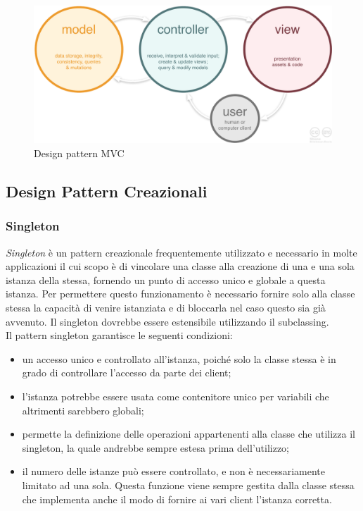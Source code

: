 \begin{figure}[H]
	\centering
	\includegraphics[width=14cm]{diagrammi_img/mvc.png}
	\caption{Design pattern MVC}
\end{figure}

\subsection{Design Pattern Creazionali}

\subsubsection{Singleton}
\textit{Singleton} è un pattern creazionale frequentemente utilizzato e necessario in molte applicazioni il cui scopo è di vincolare una classe alla creazione di una e una sola istanza della stessa, fornendo un punto di accesso unico e globale a questa istanza. Per permettere questo funzionamento è necessario fornire solo alla classe stessa la capacità di venire istanziata e di bloccarla nel caso questo sia già avvenuto. Il singleton dovrebbe essere estensibile utilizzando il subclassing.\\
Il pattern singleton garantisce le seguenti condizioni:
\begin{itemize}
	\item un accesso unico e controllato all'istanza, poiché solo la classe stessa è in grado di controllare l'accesso da parte dei client;
	\item l'istanza potrebbe essere usata come contenitore unico per variabili che altrimenti sarebbero globali;
	\item permette la definizione delle operazioni appartenenti alla classe che utilizza il singleton, la quale andrebbe sempre estesa prima dell'utilizzo;
	\item il numero delle istanze può essere controllato, e non è necessariamente limitato ad una sola. Questa funzione viene sempre gestita dalla classe stessa che implementa anche il modo di fornire ai vari client l'istanza corretta.
\end{itemize}

